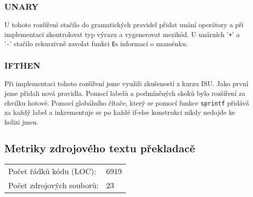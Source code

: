 \documentclass[11pt, titlepage, a4paper]{article}
\begin{document}
		\subsubsection{UNARY}
		\indent \indent U tohoto rozšíření stačilo do gramatických pravidel přidat unání operátory a při implementaci zkontrolovat typ výrazu a
		vygenerovat mezikód.
		U unárních '\texttt{+}' a '\texttt{-}' stačilo rekurzivně zavolat funkci \texttt{E}\footnotemark[1] s informací o znaménku.

		\subsubsection{IFTHEN}
		\indent \indent Při implementaci tohoto rozšíření jsme využili zkušeností z kurzu ISU\footnotemark[2]. Jako první jsme přidali nová pravidla.
		Pomocí labelů a podmíněných skoků bylo rozšíření za chvilku hotové.
		Pomocí globálního čítače, který se pomocí funkce \texttt{sprintf} přidává za každý label a inkrementuje se po každé if-else konstrukci
		nikdy nedojde ke kolizi jmen.

		\subsection{Metriky zdrojového textu překladacě}
		\begin{tabular}{ll}
		Počet řádků kódu (LOC): & 6919 \\
		Počet zdrojových souborů: & 23 \\
		\end{tabular}


		\newpage
\end{document}
